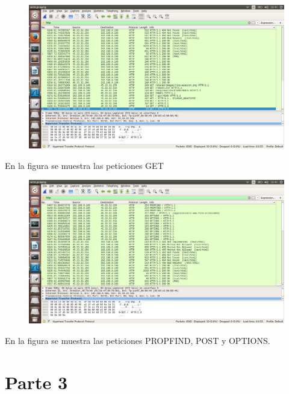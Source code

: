 \documentclass[a4paper,12pt]{article}
\begin{document}
\begin{enumerate}
 \begin{figure}[H]
  \centering
  \includegraphics[scale = 0.3]{4.png}
 \end{figure}
  En la figura se muestra las peticiones GET
  \begin{figure}[H]
   \centering
   \includegraphics[scale = 0.3]{5.png}
  \end{figure}
  En la figura se muestra las peticiones PROPFIND, POST y OPTIONS.
\end{enumerate}

\section{Parte 3}
\end{document}
